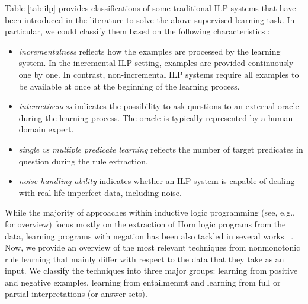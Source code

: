 Table \ref{tab:ilp} provides classifications of some traditional ILP systems that have been introduced in the literature to solve the above supervised learning task. In particular, we could classify them based on %
the following characteristics \cite{Boytcheva2007OverviewOI,R8146692}:
\begin{itemize}
\item \emph{incrementalness} %
reflects how the examples are processed by %
the learning system. In the incremental ILP setting, examples are provided continuously one by one. In contrast, non-incremental ILP systems %
require all examples to be available at once at the beginning of the learning process. %
\item \emph{interactiveness} indicates the %
possibility to ask questions to an external oracle during the learning process. The oracle is  typically represented by a human domain expert. 
\item \emph{single vs multiple predicate learning} reflects the number of target predicates in question during the rule extraction. %
\item \emph{noise-handling ability} %
indicates whether an ILP system is capable of %
dealing with real-life imperfect data, including noise. %
\end{itemize}



While the majority of approaches within inductive logic programming (see, e.g., \cite{DBLP:journals/cacm/GulwaniHKMSZ15,DBLP:journals/ml/MuggletonRPBFIS12} for overview) focus mostly on the extraction of Horn logic programs from the data, learning programs with negation has been also tackled in several works %
~\cite{DBLP:conf/ijcai/InoueK97,DBLP:journals/tocl/Sakama05,XHAIL,CorapiRL10,ILASP_system}. %
Now, we provide an overview of the most relevant techniques from nonmonotonic rule learning that mainly differ with respect to the data that they take as an input.
We classify the techniques into three major groups: learning from positive and negative examples, learning from entailmenmt and learning from full or partial interpretations (or answer sets).

